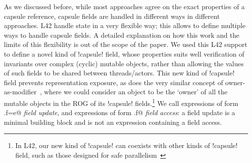 

As we discussed before, while most approaches agree on the exact properties of a capsule reference,
capsule fields are handled in different ways in different approaches. L42 handle state in a very flexible way; this allows to define multiple ways to handle capsule fields. A detailed explanation on how this work and the limits of this flexibility is out of the scope of the paper.
We used this L42 support to define a novel kind of \Q!capsule! field,
whose properties suits well verification of invariants over complex (cyclic) mutable objects,
rather than allowing the values of such fields to be shared between threads/actors.
This new kind of \Q!capsule! field prevents representation exposure, as does the very similar concept of owner-as-modifier~\cite{Dietl05universes:lightweight,10.1007/978-3-540-92188-2_4}, where we could consider an object to be the `owner' of all the mutable objects in the ROG of its \Q!capsule! fields.\footnote{In L42, our new kind of \Q!capsule! can coexists with other kinds of \Q!capsule! field, such as those designed for safe parallelism~\cite{GordonEtAl12,clebsch2015deny,GIANNINI2019145}}
We call expressions of form 
\Q@x.f=e@ \emph{field update}, and expressions of form \Q@x.f@ \emph{field access}: a field update is a minimal building block and is not an expression containing a field access.




